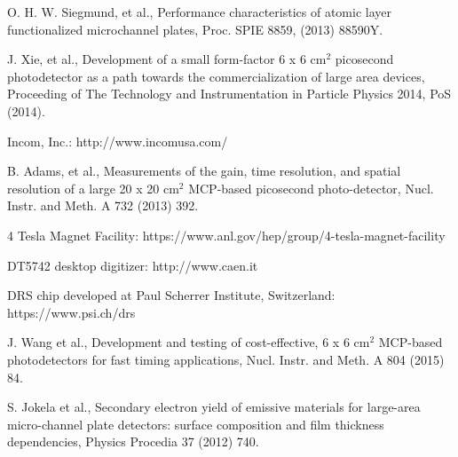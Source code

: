 \documentclass[preprint,5p]{elsarticle}
\begin{document}
\begin{thebibliography}{00}
O. H. W. Siegmund, et al., Performance characteristics of atomic layer 
      functionalized microchannel plates, Proc. SPIE 8859, (2013) 88590Y.

J. Xie, et al., Development of a small form-factor 6 x 6 cm$^2$ picosecond 
photodetector as a path towards the commercialization of large area devices, 
Proceeding of The Technology and Instrumentation in Particle Physics 2014, PoS 
(2014).

Incom, Inc.: http://www.incomusa.com/

B. Adams, et al., Measurements of the gain, time resolution, and spatial 
resolution of a large 20 x 20 cm$^2$ MCP-based picosecond photo-detector, Nucl. Instr. and 
Meth. A 732 (2013) 392.

4 Tesla Magnet Facility: https://www.anl.gov/hep/group/4-tesla-magnet-facility 

DT5742 desktop digitizer: http://www.caen.it

DRS chip developed at Paul Scherrer Institute, Switzerland: 
https://www.psi.ch/drs

J. Wang et al., Development and testing of cost-effective, 6 x 6 cm$^2$ MCP-based photodetectors for fast timing applications, Nucl. Instr. and Meth. A 804 (2015) 84.

S. Jokela et al., Secondary electron yield of emissive materials for large-area micro-channel plate detectors: surface composition and film thickness dependencies, Physics Procedia 37 (2012) 740.


\end{thebibliography}
\end{document}
